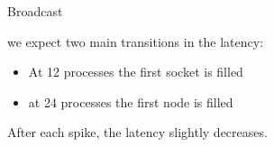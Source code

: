 \begin{frame}[fragile]{Broadcast}
\begin{multicols}{2}
\begin{figure}[H]
    
                
                
        \end{figure}

        \columnbreak

        we expect two main transitions in the latency:
        \begin{itemize}
            \item At 12 processes the first socket is filled
            \item at 24 processes the first node is filled
        \end{itemize}

        After each spike, the latency slightly decreases.
    \end{multicols}
\end{frame}

